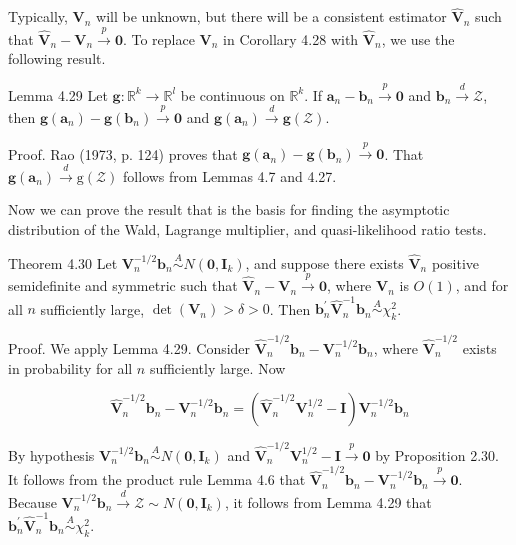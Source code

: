 \documentclass[10pt]{article}
\begin{document}
Typically, $\mathbf{V}_{n}$ will be unknown, but there will be a consistent estimator $\hat{\mathbf{V}}_{n}$ such that $\hat{\mathbf{V}}_{n}-\mathbf{V}_{n} \xrightarrow{p} \mathbf{0}$. To replace $\mathbf{V}_{n}$ in Corollary 4.28 with $\hat{\mathbf{V}}_{n}$, we use the following result.

Lemma 4.29 Let $\mathbf{g}: \mathbb{R}^{k} \rightarrow \mathbb{R}^{l}$ be continuous on $\mathbb{R}^{k}$. If $\mathbf{a}_{n}-\mathbf{b}_{n} \xrightarrow{p} \mathbf{0}$ and $\mathbf{b}_{n} \xrightarrow{d} \mathcal{Z}$, then $\mathbf{g}\left(\mathbf{a}_{n}\right)-\mathbf{g}\left(\mathbf{b}_{n}\right) \xrightarrow{p} \mathbf{0}$ and $\mathbf{g}\left(\mathbf{a}_{n}\right) \xrightarrow{d} \mathbf{g}(\mathcal{Z})$.

Proof. Rao (1973, p. 124) proves that $\mathbf{g}\left(\mathbf{a}_{n}\right)-\mathbf{g}\left(\mathbf{b}_{n}\right) \xrightarrow{p} \mathbf{0}$. That $\mathbf{g}\left(\mathbf{a}_{n}\right) \xrightarrow{d} \mathrm{g}(\mathcal{Z})$ follows from Lemmas 4.7 and 4.27.

Now we can prove the result that is the basis for finding the asymptotic distribution of the Wald, Lagrange multiplier, and quasi-likelihood ratio tests.

Theorem 4.30 Let $\mathbf{V}_{n}^{-1 / 2} \mathbf{b}_{n} \stackrel{A}{\sim} N\left(\mathbf{0}, \mathbf{I}_{k}\right)$, and suppose there exists $\hat{\mathbf{V}}_{n}$ positive semidefinite and symmetric such that $\hat{\mathbf{V}}_{n}-\mathbf{V}_{n} \xrightarrow{p} \mathbf{0}$, where $\mathbf{V}_{n}$ is $O(1)$, and for all $n$ sufficiently large, $\operatorname{det}\left(\mathbf{V}_{n}\right)>\delta>0$. Then $\mathbf{b}_{n}^{\prime} \hat{\mathbf{V}}_{n}^{-1} \mathbf{b}_{n} \stackrel{A}{\sim} \chi_{k}^{2}$.

Proof. We apply Lemma 4.29. Consider $\hat{\mathbf{V}}_{n}^{-1 / 2} \mathbf{b}_{n}-\mathbf{V}_{n}^{-1 / 2} \mathbf{b}_{n}$, where $\hat{\mathbf{V}}_{n}^{-1 / 2}$ exists in probability for all $n$ sufficiently large. Now

$$
\hat{\mathbf{V}}_{n}^{-1 / 2} \mathbf{b}_{n}-\mathbf{V}_{n}^{-1 / 2} \mathbf{b}_{n}=\left(\hat{\mathbf{V}}_{n}^{-1 / 2} \mathbf{V}_{n}^{1 / 2}-\mathbf{I}\right) \mathbf{V}_{n}^{-1 / 2} \mathbf{b}_{n}
$$

By hypothesis $\mathbf{V}_{n}^{-1 / 2} \mathbf{b}_{n} \stackrel{A}{\sim} N\left(\mathbf{0}, \mathbf{I}_{k}\right)$ and $\hat{\mathbf{V}}_{n}^{-1 / 2} \mathbf{V}_{n}^{1 / 2}-\mathbf{I} \xrightarrow{p} \mathbf{0}$ by Proposition 2.30. It follows from the product rule Lemma 4.6 that $\hat{\mathbf{V}}_{n}^{-1 / 2} \mathbf{b}_{n}- \mathbf{V}_{n}^{-1 / 2} \mathbf{b}_{n} \xrightarrow{p} \mathbf{0}$. Because $\mathbf{V}_{n}^{-1 / 2} \mathbf{b}_{n} \xrightarrow{d} \mathcal{Z} \sim N\left(\mathbf{0}, \mathbf{I}_{k}\right)$, it follows from Lemma 4.29 that $\mathbf{b}_{n}^{\prime} \hat{\mathbf{V}}_{n}^{-1} \mathbf{b}_{n} \stackrel{A}{\sim} \chi_{k}^{2}$.
\end{document}
